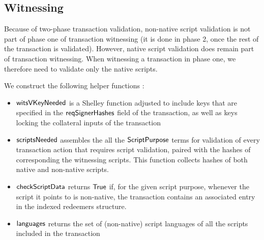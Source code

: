 \subsection{Witnessing}
\label{sec:wits}

Because of two-phase transaction validation, non-native script validation is not part of phase one of transaction witnessing
(it is done in phase 2, once the rest of the transaction is validated).
However, native script validation does remain part of transaction witnessing.
When witnessing a transaction in phase one, we therefore need to validate only the native scripts.

We construct the following helper functions :

\begin{itemize}
  \item $\mathsf{witsVKeyNeeded}$ is a Shelley function adjusted to include
  keys that are specified in the $\mathsf{reqSignerHashes}$ field of the transaction,
  as well as keys locking the collateral inputs of the transaction

  \item $\mathsf{scriptsNeeded}$ assembles the all the $\mathsf{ScriptPurpose}$ terms
  for validation of every transaction action that requires script validation,
  paired with the hashes of corresponding the witnessing scripts.
  This function collects hashes of both native and non-native scripts.

  \item $\mathsf{checkScriptData}$ returns $\mathsf{True}$ if, for the given script purpose,
  whenever the script it points to is non-native, the transaction contains an associated entry
  in the indexed redeemers structure.

  \item $\mathsf{languages}$ returns the set of (non-native) script languages
  of all the scripts included in the transaction
\end{itemize}

